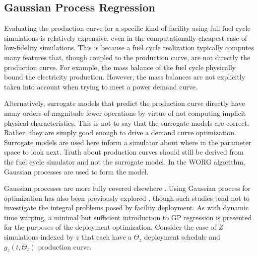 \subsection{Gaussian Process Regression}
\label{gp}

Evaluating the production curve for a specific kind of facility using
full fuel cycle simulations is relatively expensive, even in the
computationally cheapest case of low-fidelity simulations. This is because a
fuel cycle realization
typically computes many features that, though coupled to the production
curve, are not directly the production curve. For example, the mass balance of
the fuel cycle physically bound the electricity production. However, the
mass balances are not explicitly taken into account when trying to meet
a power demand curve.

Alternatively, surrogate models that predict the production curve directly
have many orders-of-magnitude fewer operations by virtue of not computing
implicit physical characteristics. This is not to say that the surrogate
models are correct.  Rather, they are simply good enough to drive a demand
curve
optimization. Surrogate models are used here inform a simulator about where
in the parameter space to look next. Truth about production curves should
still be derived from the fuel cycle simulator and not the surrogate model.
In the WORG algorithm, Gaussian processes are used to form the model.

Gaussian processes are more fully covered elsewhere
\cite{rasmussen2006gaussian}. Using Gaussian process for optimization has
also been previously explored \cite{osborne2009gaussian}, though such studies
tend not to
investigate the integral problems posed by facility deployment. As with
dynamic time warping, a minimal but sufficient introduction to GP regression
is presented
for the purposes of the deployment optimization.
Consider the case of $Z$ simulations indexed by $z$ that each have a
$\Theta_z$ deployment schedule and $g_z(t, \Theta_z)$ production curve.

